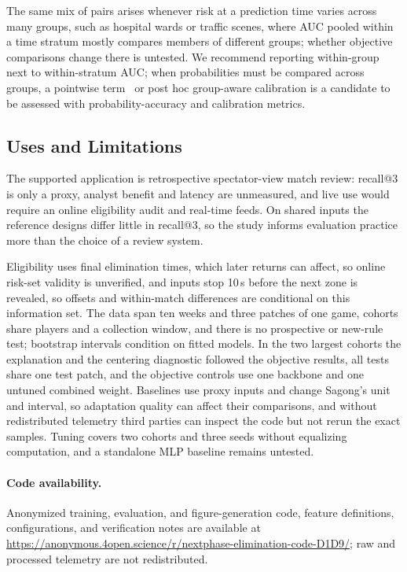 \documentclass[sigconf,anonymous]{acmart}
\newcommand{\artifacturl}{\url{https://anonymous.4open.science/r/nextphase-elimination-code-D1D9/}}
\begin{document}
The same mix of pairs arises whenever risk at a prediction time varies across many groups, such as hospital wards or traffic scenes, where AUC pooled within a time stratum mostly compares members of different groups; whether objective comparisons change there is untested. We recommend reporting within-group next to within-stratum AUC; when probabilities must be compared across groups, a pointwise term~\cite{Bai23} or post hoc group-aware calibration is a candidate to be assessed with probability-accuracy and calibration metrics.

\subsection{Uses and Limitations}
\label{sec:discussion:limits}
The supported application is retrospective spectator-view match review: recall@3 is only a proxy, analyst benefit and latency are unmeasured, and live use would require an online eligibility audit and real-time feeds. On shared inputs the reference designs differ little in recall@3, so the study informs evaluation practice more than the choice of a review system.

Eligibility uses final elimination times, which later returns can affect, so online risk-set validity is unverified, and inputs stop 10\,s before the next zone is revealed, so offsets and within-match differences are conditional on this information set. The data span ten weeks and three patches of one game, cohorts share players and a collection window, and there is no prospective or new-rule test; bootstrap intervals condition on fitted models. In the two largest cohorts the explanation and the centering diagnostic followed the objective results, all tests share one test patch, and the objective controls use one backbone and one untuned combined weight. Baselines use proxy inputs and change Sagong's unit and interval, so adaptation quality can affect their comparisons, and without redistributed telemetry third parties can inspect the code but not rerun the exact samples. Tuning covers two cohorts and three seeds without equalizing computation, and a standalone MLP baseline remains untested.

\paragraph{Code availability.}
Anonymized training, evaluation, and figure-generation code, feature definitions, configurations, and verification notes are available at \artifacturl{}; raw and processed telemetry are not redistributed.
\end{document}
